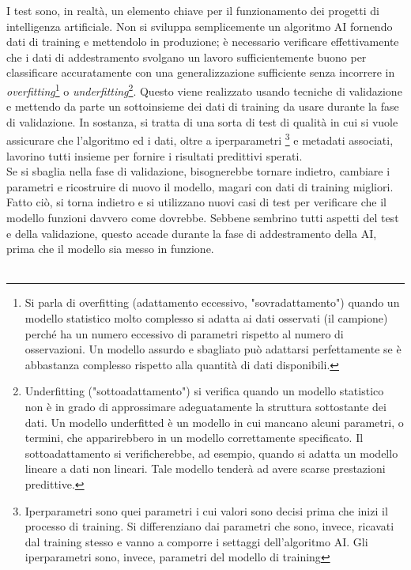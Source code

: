 \documentclass[a4paper,12pt]{report}
\begin{document}
I test sono, in realtà, un elemento chiave per il funzionamento dei progetti di intelligenza artificiale. Non si sviluppa semplicemente un algoritmo AI fornendo dati di training e mettendolo in produzione; è necessario verificare effettivamente che i dati di addestramento svolgano un lavoro sufficientemente buono per classificare accuratamente con una generalizzazione sufficiente senza incorrere in \textit{overfitting}\footnote{Si parla di overfitting (adattamento eccessivo, "sovradattamento") quando un modello statistico molto complesso si adatta ai dati osservati (il campione) perché ha un numero eccessivo di parametri rispetto al numero di osservazioni. Un modello assurdo e sbagliato può adattarsi perfettamente se è abbastanza complesso rispetto alla quantità di dati disponibili.} o \textit{underfitting}\footnote{Underfitting ("sottoadattamento") si verifica quando un modello statistico non è in grado di approssimare adeguatamente la struttura sottostante dei dati. Un modello underfitted è un modello in cui mancano alcuni parametri, o termini, che apparirebbero in un modello correttamente specificato. Il sottoadattamento si verificherebbe, ad esempio, quando si adatta un modello lineare a dati non lineari. Tale modello tenderà ad avere scarse prestazioni predittive.}. Questo viene realizzato usando tecniche di validazione e mettendo da parte un sottoinsieme dei dati di training da usare durante la fase di validazione. In sostanza, si tratta di una sorta di test di qualità in cui si vuole assicurare che l'algoritmo ed i dati, oltre a iperparametri \footnote{Iperparametri sono quei parametri i cui valori sono decisi prima che inizi il processo di training. Si differenziano dai parametri che sono, invece, ricavati dal training stesso e vanno a comporre i settaggi dell'algoritmo AI. Gli iperparametri sono, invece, parametri del modello di training} e metadati associati, lavorino tutti insieme per fornire i risultati predittivi sperati.\\
Se si sbaglia nella fase di validazione, bisognerebbe tornare indietro, cambiare i parametri e ricostruire di nuovo il modello, magari con dati di training migliori. Fatto ciò, si torna indietro e si utilizzano nuovi casi di test per verificare che il modello funzioni davvero come dovrebbe. Sebbene sembrino tutti aspetti del test e della validazione, questo accade durante la fase di addestramento della AI, prima che il modello sia messo in funzione.\\~\\
\end{document}
